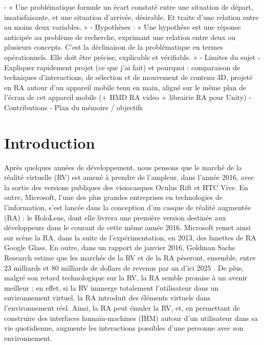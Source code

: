   - « Une problématique formule un écart constaté entre une situation de départ, insatisfaisante, et une situation d’arrivée, désirable. Et traite d’une relation entre au moins deux variables. »
  - Hypothèses : « Une hypothèse est une réponse anticipée au problème de recherche, exprimant une relation entre deux ou plusieurs concepts. C’est la déclinaison de la problématique en termes opérationnels. Elle doit être précise, explicable et vérifiable. »
  - Limites du sujet
- Expliquer rapidement projet (ce que j'ai fait) et pourquoi : comparaison de techniques d'interactions, de sélection et de mouvement de contenu 3D, projeté en RA autour d'un appareil mobile tenu en main, aligné sur le même plan de l'écran de cet appareil mobile (+ HMD RA video + librairie RA pour Unity)
- Contributions
- Plan du mémoire / objectifs

\section{Introduction}
Après quelques années de développement, nous pensons que le marché de la réalité virtuelle (RV) est amené à prendre de l'ampleur, dans l'année 2016, avec la sortie des versions publiques des visiocasques Oculus Rift et HTC Vive. En outre, Microsoft, l'une des plus grandes entreprises en technologies de l'information, s'est lancée dans la conception d'un casque de réalité augmentée (RA) : le HoloLens, dont elle livrera une première version destinée aux développeurs dans le courant de cette même année 2016. Microsoft remet ainsi sur scène la RA, dans la suite de l'expérimentation, en 2013, des lunettes de RA Google Glass. En outre, dans un rapport de janvier 2016, Goldman Sachs Research estime que les marchés de la RV et de la RA pèseront, ensemble, entre 23 milliards et 80 milliards de dollars de revenus par an d'ici 2025 \citep{BelliniChenSugiyamaEtAl2016}. De plus, malgré son retard technologique sur la RV, la RA semble promise à un avenir meilleur \citep{BelliniChenSugiyamaEtAl2016} : en effet, si la RV immerge totalement l'utilisateur dans un environnement virtuel, la RA introduit des éléments virtuels dans l'environnement réel. Ainsi, la RA peut émuler la RV, et, en permettant de construire des interfaces humain-machines (IHM) autour d'un utilisateur dans sa vie quotidienne, augmente les interactions possibles d'une personne avec son environnement.

